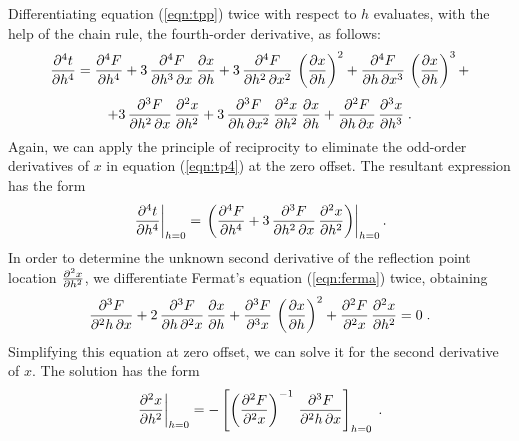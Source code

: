 Differentiating equation (\ref{eqn:tpp}) twice with respect to $h$ evaluates,
with the help of the chain rule, the fourth-order derivative, as
follows:
\begin{equation}
{{\partial^4 t} \over {\partial h^4}}  = 
{{\partial^4 F} \over {\partial h^4}} +
3\,{{\partial^4 F} \over {\partial h^3\,\partial x}}\,
{{\partial x} \over {\partial h}} +
3\,{{\partial^4 F} \over {\partial h^2\,\partial x^2}}\,
\left({{\partial x} \over {\partial h}}\right)^2 +
{{\partial^4 F} \over {\partial h\,\partial x^3}}\,
\left({{\partial x} \over {\partial h}}\right)^3 + 
\nonumber 
\end{equation}
\begin{equation}
 +  3\,{{\partial^3 F} \over {\partial h^2\,\partial x}}\,
{{\partial^2 x} \over {\partial h^2}} +
3\,{{\partial^3 F} \over {\partial h\,\partial x^2}}\,
{{\partial^2 x} \over {\partial h^2}}\,
{{\partial x} \over {\partial h}} +
{{\partial^2 F} \over {\partial h\,\partial x}}\,
{{\partial^3 x} \over {\partial h^3}}\;.
\label{eqn:tp4}
\end{equation}
Again, we can apply the principle of reciprocity to eliminate the
odd-order derivatives of $x$ in equation (\ref{eqn:tp4}) at the zero
offset. The resultant expression has the form
\begin{equation}
\left.{{\partial^4 t} \over {\partial h^4}}\right|_{h=0} = 
\left.\left({{\partial^4 F} \over {\partial h^4}} +
3\,{{\partial^3 F} \over {\partial h^2\,\partial x}}\,
{{\partial^2 x} \over {\partial h^2}}\right)\right|_{h=0}.
\label{eqn:tp41}
\end{equation}
In order to determine the unknown second derivative of the reflection
point location ${{\partial^2 x} \over {\partial h^2}}$, we
differentiate Fermat's equation (\ref{eqn:ferma}) twice, obtaining
\begin{equation}
{{\partial^3 F} \over {\partial^2 h\,\partial x}} + 
2\,{{\partial^3 F} \over {\partial h\,\partial^2 x}}\,
{{\partial x} \over {\partial h}} +
{{\partial^3 F} \over {\partial^3 x}}\,
\left({{\partial x} \over {\partial h}}\right)^2 +
{{\partial^2 F} \over {\partial^2 x}}\,
{{\partial^2 x} \over {\partial h^2}} = 0\;.
\label{eqn:ferma2}
\end{equation}
Simplifying this equation at zero offset, we can solve it for the
second derivative of $x$. The solution has the form
\begin{equation}
\left.{{\partial^2 x} \over {\partial h^2}}\right|_{h=0} = 
- \left[\left({{\partial^2 F} \over {\partial^2 x}}\right)^{-1}\,
{{\partial^3 F} \over {\partial^2 h\,\partial x}}\right]_{h=0}\;.
\label{eqn:dxdh}
\end{equation}
